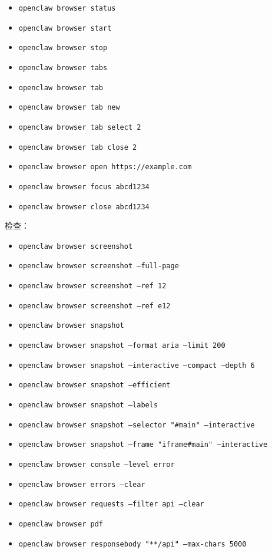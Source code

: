 \begin{itemize}
  \item \texttt{openclaw browser status}
  \item \texttt{openclaw browser start}
  \item \texttt{openclaw browser stop}
  \item \texttt{openclaw browser tabs}
  \item \texttt{openclaw browser tab}
  \item \texttt{openclaw browser tab new}
  \item \texttt{openclaw browser tab select 2}
  \item \texttt{openclaw browser tab close 2}
  \item \texttt{openclaw browser open https://example.com}
  \item \texttt{openclaw browser focus abcd1234}
  \item \texttt{openclaw browser close abcd1234}
\end{itemize}


检查：

\begin{itemize}
  \item \texttt{openclaw browser screenshot}
  \item \texttt{openclaw browser screenshot --full-page}
  \item \texttt{openclaw browser screenshot --ref 12}
  \item \texttt{openclaw browser screenshot --ref e12}
  \item \texttt{openclaw browser snapshot}
  \item \texttt{openclaw browser snapshot --format aria --limit 200}
  \item \texttt{openclaw browser snapshot --interactive --compact --depth 6}
  \item \texttt{openclaw browser snapshot --efficient}
  \item \texttt{openclaw browser snapshot --labels}
  \item \texttt{openclaw browser snapshot --selector "\#main" --interactive}
  \item \texttt{openclaw browser snapshot --frame "iframe\#main" --interactive}
  \item \texttt{openclaw browser console --level error}
  \item \texttt{openclaw browser errors --clear}
  \item \texttt{openclaw browser requests --filter api --clear}
  \item \texttt{openclaw browser pdf}
  \item \texttt{openclaw browser responsebody "**/api" --max-chars 5000}
\end{itemize}



